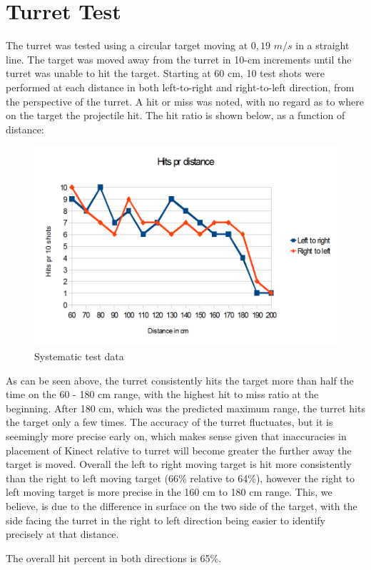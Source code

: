 \section{Turret Test}
The turret was tested using a circular target moving at $0,19$ $m/s$ in a straight line. 
The target was moved away from the turret in 10-cm increments until the turret was unable to hit the target. Starting at 60 cm, 10 test shots were performed at each distance in both left-to-right and right-to-left direction, from the perspective of the turret. A hit or miss was noted, with no regard as to where on the target the projectile hit. The hit ratio is shown below, as a function of distance:

\begin{figure}
	\includegraphics[scale=0.5]{img/test.png}
	\caption{Systematic test data}
	\label{systest}
\end{figure}

As can be seen above, the turret consistently hits the target more than half the time on the 60 - 180 cm range, with the highest hit to miss ratio at the beginning. After 180 cm, which was the predicted maximum range, the turret hits the target only a few times. The accuracy of the turret fluctuates, but it is seemingly more precise early on, which makes sense given that inaccuracies in placement of Kinect relative to turret will become greater the further away the target is moved. Overall the left to right moving target is hit more consistently than the right to left moving target (66\% relative to 64\%), however the right to left moving target is more precise in the 160 cm to 180 cm range. This, we believe, is due to the difference in surface on the two side of the target, with the side facing the turret in the right to left direction being easier to identify precisely at that distance.

The overall hit percent in both directions is 65\%.
